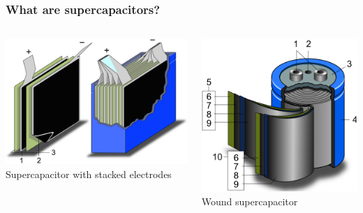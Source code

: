 \documentclass[10pt,xcolor=dvipsnames,compress]{beamer}
\begin{document}
\begin{frame}
\frametitle{What are supercapacitors?}
\vfill


\begin{columns}[T] %
     \begin{column}[T]{6cm} %
	\includegraphics[trim = 0mm 0mm 0mm 0mm, clip, width=.7\textwidth]{figs/stacked.png}
	\\Supercapacitor with stacked electrodes
     \end{column}
     \begin{column}[T]{4cm} %
	\includegraphics[trim = 0mm 0mm 0mm 0mm, clip, width=.7\textwidth]{figs/wound.png}
	\\ Wound supercapacitor
     \end{column}
\end{columns}


\end{frame}
\end{document}
